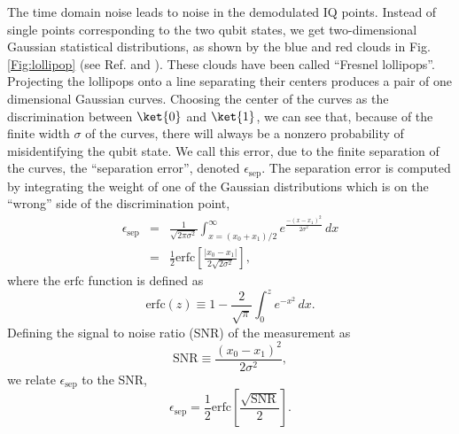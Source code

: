 The time domain noise leads to noise in the demodulated IQ points.
Instead of single points corresponding to the two qubit states, we get two-dimensional Gaussian statistical distributions, as shown by the blue and red clouds in Fig.\,\ref{Fig:lollipop} (see Ref. \cite{Schoukens:DFTNoise1986} and \citeinternaltype {}).
These clouds have been called ``Fresnel lollipops''.
Projecting the lollipops onto a line separating their centers produces a pair of one dimensional Gaussian curves.
Choosing the center of the curves as the discrimination between $\ket{0}$ and $\ket{1}$, we can see that, because of the finite width $\sigma$ of the curves, there will always be a nonzero probability of misidentifying the qubit state.
We call this error, due to the finite separation of the curves, the ``separation error'', denoted $\epsilon_{\text{sep}}$.
The separation error is computed by integrating the weight of one of the Gaussian distributions which is on the ``wrong'' side of the discrimination point, \begin{eqnarray}
\epsilon_{\text{sep}} &=& \frac{1}{\sqrt{2\pi \sigma^2}} \int_{x=(x_0 + x_1)/2}^{\infty} e^{\frac{-(x-x_1)^2}{2\sigma^2}} \, dx \nonumber \\
&=& \frac{1}{2}\textrm{erfc}\left[ \frac{\left| x_0 - x_1 \right|}{2 \sqrt{2 \sigma^2}} \right] , \label{eq:sec:Lollipops:epsilon_sep} \end{eqnarray}
where the $\textrm{erfc}$ function is defined as \begin{equation}
\textrm{erfc}(z) \equiv 1 - \frac{2}{\sqrt{\pi}}\int_0^z e^{-x^2}\,dx . \end{equation}
Defining the signal to noise ratio (SNR) of the measurement as \begin{equation}
\text{SNR} \equiv \frac{(x_0-x_1)^2}{2 \sigma^2} , \label{eq:sec:lollipops:SNR} \end{equation}
we relate $\epsilon_{\text{sep}}$ to the SNR, \begin{equation}
\epsilon_{\text{sep}} = \frac{1}{2} \textrm{erfc} \left[ \frac{\sqrt{\text{SNR}}}{2} \right] . \label{eq:sec:lollipops:e_sepVsSNR} \end{equation}
